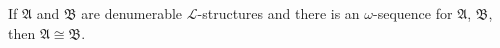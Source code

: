 If $\mathfrak{A}$ and $\mathfrak{B}$ are denumerable $\mathcal{L}$-structures and there is an $\omega$-sequence for $\mathfrak{A}$, $\mathfrak{B}$, then $\mathfrak{A} \cong \mathfrak{B}$.
